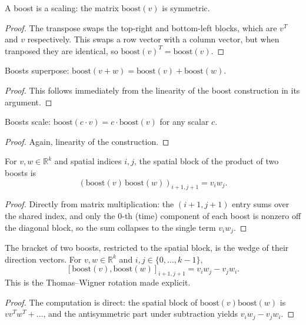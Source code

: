 \begin{theorem}
A boost is a scaling: the matrix $\text{boost}(v)$ is symmetric.
\end{theorem}
\begin{proof}
The transpose swaps the top-right and bottom-left blocks, which are $v^T$ and $v$ respectively.
This swaps a row vector with a column vector, but when tranposed they are identical, so
$\text{boost}(v)^T = \text{boost}(v)$.
\end{proof}

\begin{theorem}
Boosts superpose: $\text{boost}(v + w) = \text{boost}(v) + \text{boost}(w)$.
\end{theorem}
\begin{proof}
This follows immediately from the linearity of the boost construction in its argument.
\end{proof}

\begin{theorem}
Boosts scale: $\text{boost}(c \cdot v) = c \cdot \text{boost}(v)$ for any scalar $c$.
\end{theorem}
\begin{proof}
Again, linearity of the construction.
\end{proof}

\begin{theorem}
For $v, w \in \mathbb{R}^k$ and spatial indices $i,j$, the spatial block of the
product of two boosts is
\[
(\text{boost}(v)\,\text{boost}(w))_{i+1,j+1} = v_i w_j.
\]
\end{theorem}
\begin{proof}
Directly from matrix multiplication: the $(i{+}1,j{+}1)$ entry sums over the
shared index, and only the $0$-th (time) component of each boost is
nonzero off the diagonal block, so the sum collapses to the single term
$v_i w_j$.
\end{proof}

\begin{theorem}
The bracket of two boosts, restricted to the spatial block, is the wedge of their
direction vectors. For $v, w \in \mathbb{R}^k$ and $i, j \in \{0, \ldots, k-1\}$,
\[[\text{boost}(v), \text{boost}(w)]_{i+1, j+1} = v_i w_j - v_j w_i.\]
This is the Thomas--Wigner rotation made explicit.
\end{theorem}
\begin{proof}
The computation is direct: the spatial block of $\text{boost}(v) \text{boost}(w)$ is $vv^T w^T + \ldots$,
and the antisymmetric part under subtraction yields $v_i w_j - v_j w_i$.
\end{proof}

